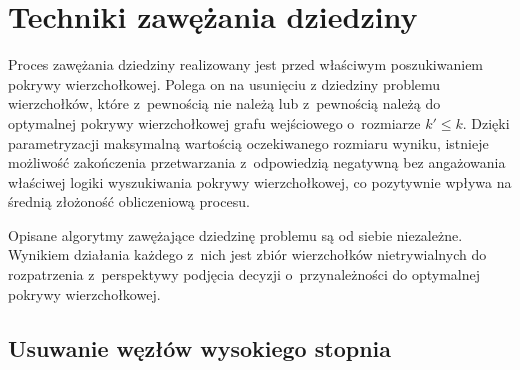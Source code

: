 \section{Techniki zawężania dziedziny}\label{Section_kernelization}

Proces zawężania dziedziny realizowany jest przed właściwym poszukiwaniem
pokrywy wierzchołkowej. Polega on na usunięciu z dziedziny problemu
wierzchołków, które z~pewnością nie należą lub z~pewnością należą do optymalnej
pokrywy wierzchołkowej grafu wejściowego o~rozmiarze $k\prime \leq k$.
Dzięki parametryzacji maksymalną wartością oczekiwanego rozmiaru wyniku,
istnieje możliwość zakończenia przetwarzania z~odpowiedzią negatywną bez
angażowania właściwej logiki wyszukiwania pokrywy wierzchołkowej, co pozytywnie
wpływa na średnią złożoność obliczeniową procesu.

Opisane algorytmy zawężające dziedzinę problemu są od siebie niezależne.
Wynikiem działania każdego z~nich jest zbiór wierzchołków nietrywialnych do
rozpatrzenia z~perspektywy podjęcia decyzji o~przynależności do optymalnej
pokrywy wierzchołkowej.

\subsection{Usuwanie węzłów wysokiego stopnia}\label{section_kernelization_high-degree}

